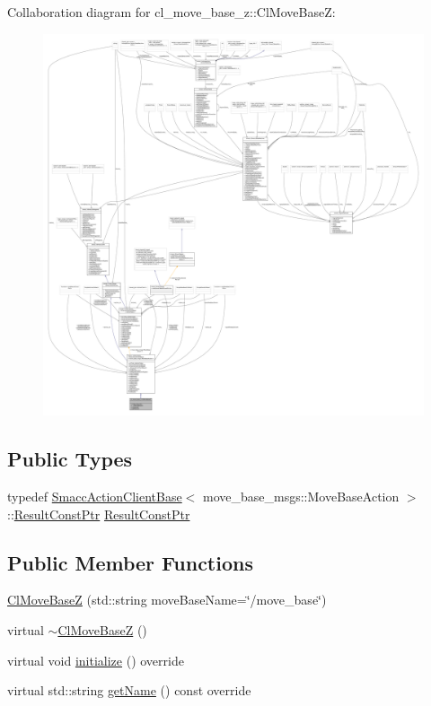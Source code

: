 Collaboration diagram for cl\+\_\+move\+\_\+base\+\_\+z\+:\+:Cl\+Move\+BaseZ\+:
\nopagebreak
\begin{figure}[H]
\begin{center}
\leavevmode
\includegraphics[width=350pt]{classcl__move__base__z_1_1ClMoveBaseZ__coll__graph}
\end{center}
\end{figure}
\subsection*{Public Types}
\begin{DoxyCompactItemize}
\item 
typedef \hyperlink{classsmacc_1_1client__bases_1_1SmaccActionClientBase_af38f27dd26f8a87fea6b3eaa4a84e604}{Smacc\+Action\+Client\+Base}$<$ move\+\_\+base\+\_\+msgs\+::\+Move\+Base\+Action $>$\+::\hyperlink{classcl__move__base__z_1_1ClMoveBaseZ_a99373d0c15ae96684462d8677f5fd632}{Result\+Const\+Ptr} \hyperlink{classcl__move__base__z_1_1ClMoveBaseZ_a99373d0c15ae96684462d8677f5fd632}{Result\+Const\+Ptr}
\end{DoxyCompactItemize}
\subsection*{Public Member Functions}
\begin{DoxyCompactItemize}
\item 
\hyperlink{classcl__move__base__z_1_1ClMoveBaseZ_a4c44e8587c4054a15b06893518c3219c}{Cl\+Move\+BaseZ} (std\+::string move\+Base\+Name=\char`\"{}/move\+\_\+base\char`\"{})
\item 
virtual \hyperlink{classcl__move__base__z_1_1ClMoveBaseZ_a33d1432bacc3bb364a93b04954a01f76}{$\sim$\+Cl\+Move\+BaseZ} ()
\item 
virtual void \hyperlink{classcl__move__base__z_1_1ClMoveBaseZ_a7572804edd84a956967b9f8cf2d4081e}{initialize} () override
\item 
virtual std\+::string \hyperlink{classcl__move__base__z_1_1ClMoveBaseZ_a3c511340ea5df8cbdb833c6c701c47f8}{get\+Name} () const override
\end{DoxyCompactItemize}

